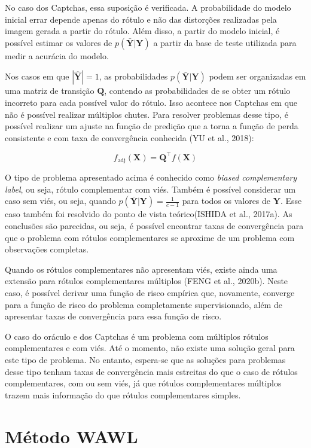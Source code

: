 \documentclass[12pt,twoside,brazilian]{book}
\begin{document}
No caso dos Captchas, essa suposição é verificada. A probabilidade do
modelo inicial errar depende apenas do rótulo e não das distorções
realizadas pela imagem gerada a partir do rótulo. Além disso, a partir
do modelo inicial, é possível estimar os valores de
\(p(\bar{\mathbf Y}|\mathbf Y)\) a partir da base de teste utilizada
para medir a acurácia do modelo.

Nos casos em que \(|\hat{\mathbf Y}|=1\), as probabilidades
\(p(\bar{\mathbf Y}|\mathbf Y)\) podem ser organizadas em uma matriz de
transição \(\mathbf Q\), contendo as probabilidades de se obter um
rótulo incorreto para cada possível valor do rótulo. Isso acontece nos
Captchas em que não é possível realizar múltiplos chutes. Para resolver
problemas desse tipo, é possível realizar um ajuste na função de
predição que a torna a função de perda consistente e com taxa de
convergência conhecida (YU et al., 2018):

\[
f_{\text{adj}} (\mathbf X) = \mathbf Q ^{\top}f(\mathbf X)
\]

O tipo de problema apresentado acima é conhecido como \emph{biased
complementary label}, ou seja, rótulo complementar com viés. Também é
possível considerar um caso sem viés, ou seja, quando
\(p(\bar{\mathbf Y}|\mathbf Y) = \frac{1}{c-1}\) para todos os valores
de \(\mathbf Y\). Esse caso também foi resolvido do ponto de vista
teórico(ISHIDA et al., 2017a). As conclusões são parecidas, ou seja, é
possível encontrar taxas de convergência para que o problema com rótulos
complementares se aproxime de um problema com observações completas.

Quando os rótulos complementares não apresentam viés, existe ainda uma
extensão para rótulos complementares múltiplos (FENG et al., 2020b).
Neste caso, é possível derivar uma função de risco empírica que,
novamente, converge para a função de risco do problema completamente
supervisionado, além de apresentar taxas de convergência para essa
função de risco.

O caso do oráculo e dos Captchas é um problema com múltiplos rótulos
complementares e com viés. Até o momento, não existe uma solução geral
para este tipo de problema. No entanto, espera-se que as soluções para
problemas desse tipo tenham taxas de convergência mais estreitas do que
o caso de rótulos complementares, com ou sem viés, já que rótulos
complementares múltiplos trazem mais informação do que rótulos
complementares simples.

\hypertarget{sec-wawl}{%
\section{Método WAWL}\label{sec-wawl}}
\end{document}
